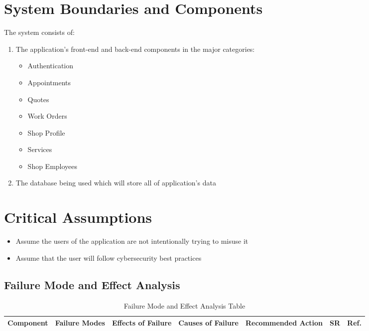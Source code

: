 \documentclass{article}
\begin{document}
\section{System Boundaries and Components}
The system consists of:
\begin{enumerate}
	\item The application's front-end and back-end components in the major categories:
	      \begin{itemize}
		      \item Authentication
		      \item Appointments
		      \item Quotes
		      \item Work Orders
		      \item Shop Profile
		      \item Services
		      \item Shop Employees
	      \end{itemize}
	\item The database being used which will store all of application's data
\end{enumerate}

\section{Critical Assumptions}
\begin{itemize}
	\item Assume the users of the application are not intentionally trying to misuse it
	\item Assume that the user will follow cybersecurity best practices
\end{itemize}

\newpage
\begin{landscape}
	\section{Failure Mode and Effect Analysis}
	\begin{table}[H]
		\centering
		\caption{Failure Mode and Effect Analysis Table}
		\begin{adjustbox}{width=\paperwidth}
			\begin{tabular}{c|c|c|c|c|c|c}
				\hline
				\textbf{Component} & \textbf{Failure Modes} & \textbf{Effects of Failure} & \textbf{Causes of Failure} & \textbf{Recommended Action} & \textbf{SR} & \textbf{Ref.} \\
				\hline
			\end{tabular}
		\end{adjustbox}
	\end{table}
\end{landscape}
\end{document}
